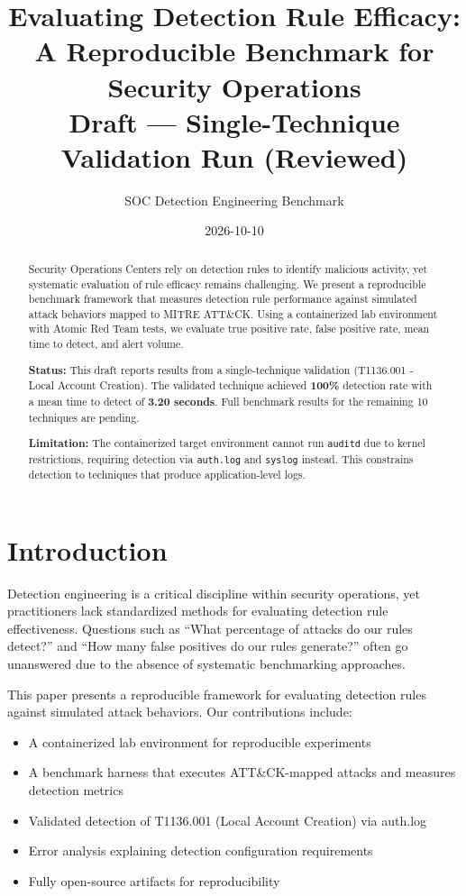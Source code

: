 \documentclass[11pt,a4paper]{article}
\title{Evaluating Detection Rule Efficacy: A Reproducible Benchmark for Security Operations\\
\large{Draft --- Single-Technique Validation Run (Reviewed)}}
\author{SOC Detection Engineering Benchmark}
\date{2026-10-10}
\begin{document}
\maketitle

\begin{abstract}
Security Operations Centers rely on detection rules to identify malicious activity, yet systematic evaluation of rule efficacy remains challenging. We present a reproducible benchmark framework that measures detection rule performance against simulated attack behaviors mapped to MITRE ATT\&CK. Using a containerized lab environment with Atomic Red Team tests, we evaluate true positive rate, false positive rate, mean time to detect, and alert volume.

\textbf{Status:} This draft reports results from a single-technique validation (T1136.001 - Local Account Creation). The validated technique achieved \textbf{100\%} detection rate with a mean time to detect of \textbf{3.20 seconds}. Full benchmark results for the remaining 10 techniques are pending.

\textbf{Limitation:} The containerized target environment cannot run \texttt{auditd} due to kernel restrictions, requiring detection via \texttt{auth.log} and \texttt{syslog} instead. This constrains detection to techniques that produce application-level logs.
\end{abstract}

\section{Introduction}

Detection engineering is a critical discipline within security operations, yet practitioners lack standardized methods for evaluating detection rule effectiveness. Questions such as ``What percentage of attacks do our rules detect?'' and ``How many false positives do our rules generate?'' often go unanswered due to the absence of systematic benchmarking approaches.

This paper presents a reproducible framework for evaluating detection rules against simulated attack behaviors. Our contributions include:

\begin{itemize}
    \item A containerized lab environment for reproducible experiments
    \item A benchmark harness that executes ATT\&CK-mapped attacks and measures detection metrics
    \item Validated detection of T1136.001 (Local Account Creation) via auth.log
    \item Error analysis explaining detection configuration requirements
    \item Fully open-source artifacts for reproducibility
\end{itemize}
\end{document}
